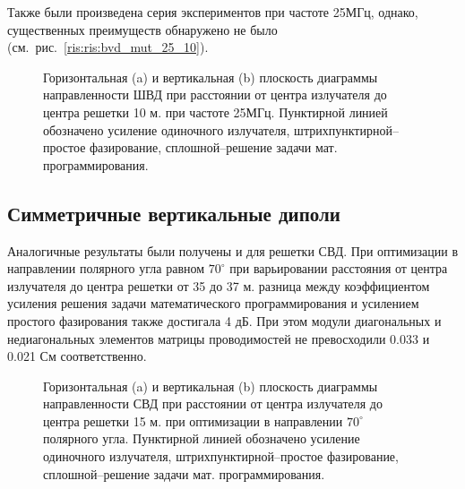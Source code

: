 Также были произведена серия экспериментов при частоте 25МГц, однако, существенных преимуществ обнаружено не было (см.~рис.~\ref{ris:ris:bvd_mut_25_10}).

\begin{figure}
\begin{minipage}[h]{0.49\linewidth}
\end{minipage}
\hfill
\begin{minipage}[h]{0.49\linewidth}
\end{minipage}
\caption{Горизонтальная (a) и вертикальная (b) плоскость диаграммы направленности ШВД при расстоянии от центра излучателя до центра решетки 10 м. при частоте 25МГц. Пунктирной линией обозначено усиление одиночного излучателя, штрихпунктирной--простое фазирование, сплошной--решение задачи мат. программирования.}
\label{ris:bvd_mut_25_10}
\end{figure}

\subsection{Симметричные вертикальные диполи}

Аналогичные результаты были получены и для решетки СВД. При оптимизации в направлении полярного угла равном $70^{\circ}$ при варьировании расстояния от центра излучателя до центра решетки от 35 до 37 м. разница между коэффициентом усиления решения задачи математического программирования и усилением простого фазирования также достигала 4 дБ. При этом модули диагональных и недиагональных элементов матрицы проводимостей не превосходили 0.033 и 0.021 См соответственно.

\begin{figure}
\begin{minipage}[h]{0.49\linewidth}
\end{minipage}
\hfill
\begin{minipage}[h]{0.49\linewidth}
\end{minipage}
\caption{Горизонтальная (a) и вертикальная (b) плоскость диаграммы направленности СВД при расстоянии от центра излучателя до центра решетки 15 м. при оптимизации в направлении $70^{\circ}$ полярного угла. Пунктирной линией обозначено усиление одиночного излучателя, штрихпунктирной--простое фазирование, сплошной--решение задачи мат. программирования.}
\label{ris:svd_mut_5_70_15}
\end{figure}

